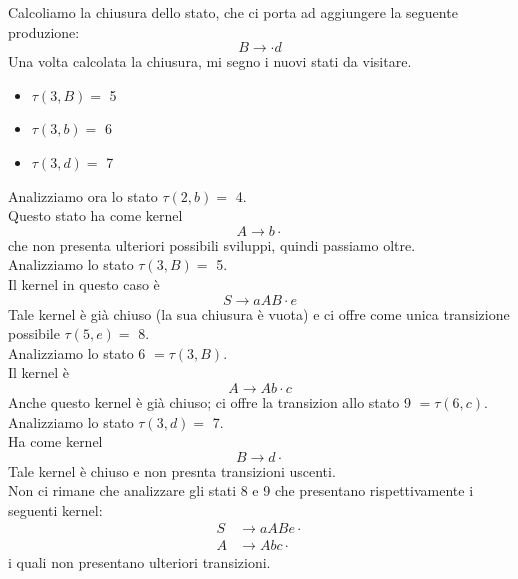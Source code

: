 \documentclass[class=book, crop=false, oneside, 12pt]{standalone}
\begin{document}
Calcoliamo la chiusura dello stato, che ci porta ad aggiungere la seguente produzione:
\begin{equation*}
    B \to \cdot d
\end{equation*}
Una volta calcolata la chiusura, mi segno i nuovi stati da visitare.
\begin{itemize}
    \item \(\tau (3, B) =\) 5
    \item \(\tau (3, b) =\) 6
    \item \(\tau (3, d) =\) 7
\end{itemize}
\noindent Analizziamo ora lo stato \(\tau (2, b) =\) 4. \\
Questo stato ha come kernel
\begin{equation*}
    A \to b \cdot
\end{equation*}
che non presenta ulteriori possibili sviluppi, quindi passiamo oltre.
\\
Analizziamo lo stato \(\tau (3, B) =\) 5. \\
Il kernel in questo caso è
\begin{equation*}
    S \to aAB \cdot e
\end{equation*}
Tale kernel è già chiuso (la sua chiusura è vuota) e ci offre come unica transizione possibile \(\tau (5, e) =\) 8.
\\
Analizziamo lo stato 6 \( = \tau (3, B)\). \\
Il kernel è
\begin{equation*}
    A \to Ab \cdot c
\end{equation*}
Anche questo kernel è già chiuso; ci offre la transizion allo stato 9 \(= \tau (6, c)\).
\\
Analizziamo lo stato \(\tau (3, d) =\) 7. \\
Ha come kernel
\begin{equation*}
    B \to d \cdot 
\end{equation*}
Tale kernel è chiuso e non presnta transizioni uscenti.
\\
Non ci rimane che analizzare gli stati 8 e 9 che presentano rispettivamente i seguenti kernel:
\begin{align*}
    S &\to aABe \cdot \\
    A &\to Abc \cdot
\end{align*}
i quali non presentano ulteriori transizioni.
\end{document}
